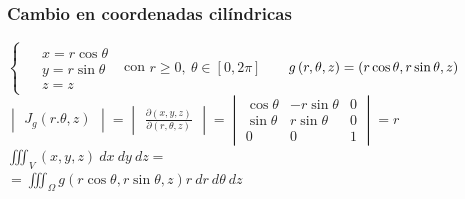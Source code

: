 \documentclass{report}
\begin{document}
      \subsubsection{Cambio en coordenadas cilíndricas}
        \vspace{0.2cm}
        \begin{figure}
          \vspace{-0.3cm}
          \vspace{-1\intextsep}
            \begin{center}
            \end{center}
        \end{figure}
        $\begin{cases}\begin{aligned} &x=r\cos\theta\\ &y=r\sin\theta\\ &z=z\end{aligned}\end{cases}$ con $r\geq 0,\ \theta\in\left[0,2\pi\right]$
        $\hspace{0.5cm}g\left(r,\theta,z\right)=\left(r\cos\theta,r\sin\theta,z\right)$\\

        \vspace{0.2cm}$\begin{vmatrix}J_g\left(r.\theta,z\right)\end{vmatrix}=
        \begin{vmatrix}\frac{\partial\left(x,y,z\right)}{\partial\left(r,\theta,z\right)}\end{vmatrix}=
        \begin{vmatrix}
        \cos\theta& -r\sin\theta& 0\\
        \sin\theta& r\sin\theta & 0\\
        0         & 0           & 1
        \end{vmatrix}=r$
        $\iiint_V \left(x,y,z\right)\ dx\ dy\ dz=$\vspace{0.4cm}\\
        \hspace*{1cm}$=\iiint_\Omega g\left(r\cos\theta,r\sin\theta,z\right)r\ dr\ d\theta\ dz$
\end{document}
